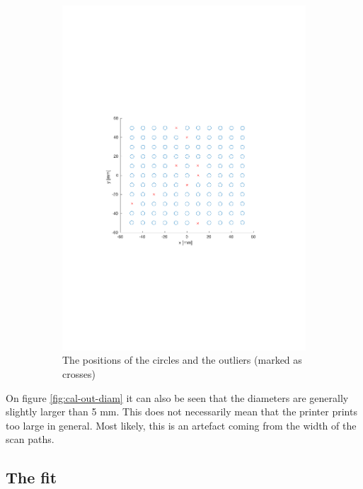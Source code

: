 \begin{figure}
\begin{subfigure}{0.72\textwidth}
  \includegraphics[clip, trim=3.5cm 8cm 3.5cm 8cm, width=\linewidth]{Pictures/cal-outliers-position.pdf}
  \caption{The positions of the circles and the outliers (marked as crosses)}
  \label{fig:cal-out-pos}
\end{subfigure}
\caption{}
\label{fig:filtering-outliers}
\end{figure}

On figure \ref{fig:cal-out-diam} it can also be seen that the diameters are generally slightly larger than 5 mm. This does not necessarily mean that the printer prints too large in general. Most likely, this is an artefact coming from the width of the scan paths.

\subsection{The fit} \label{sec:the-fit}

